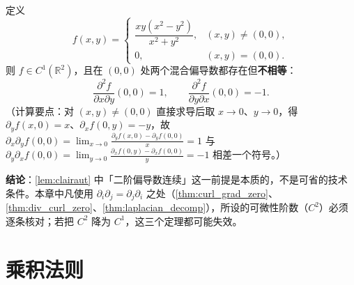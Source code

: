 \begin{example}[反例：$C^2$ 假设不可省]\label{ex:clairaut_failure}
定义
\[
f(x,y) =
\begin{cases}
\dfrac{xy(x^2-y^2)}{x^2+y^2}, & (x,y)\ne(0,0),\\[6pt]
0, & (x,y)=(0,0).
\end{cases}
\]
则 $f\in C^1(\mathbb R^2)$，且在 $(0,0)$ 处两个混合偏导数都存在但\textbf{不相等}：
\[
\frac{\partial^2 f}{\partial x\partial y}(0,0) = 1,
\qquad
\frac{\partial^2 f}{\partial y\partial x}(0,0) = -1 .
\]
（计算要点：对 $(x,y)\ne(0,0)$ 直接求导后取 $x\to0$、$y\to0$，得 $\partial_yf(x,0)=x$、$\partial_x f(0,y)=-y$，故 $\partial_x\partial_yf(0,0)=\lim_{x\to0}\frac{\partial_yf(x,0)-\partial_yf(0,0)}{x}=1$ 与 $\partial_y\partial_xf(0,0)=\lim_{y\to0}\frac{\partial_xf(0,y)-\partial_xf(0,0)}{y}=-1$ 相差一个符号。）

\textbf{结论}：\cref{lem:clairaut} 中「二阶偏导数连续」这一前提是本质的，不是可省的技术条件。本章中凡使用 $\partial_i\partial_j=\partial_j\partial_i$ 之处（\cref{thm:curl_grad_zero}、\cref{thm:div_curl_zero}、\cref{thm:laplacian_decomp}），所设的可微性阶数（$C^2$）必须逐条核对；若把 $C^2$ 降为 $C^1$，这三个定理都可能失效。
\end{example}

\section{乘积法则}

